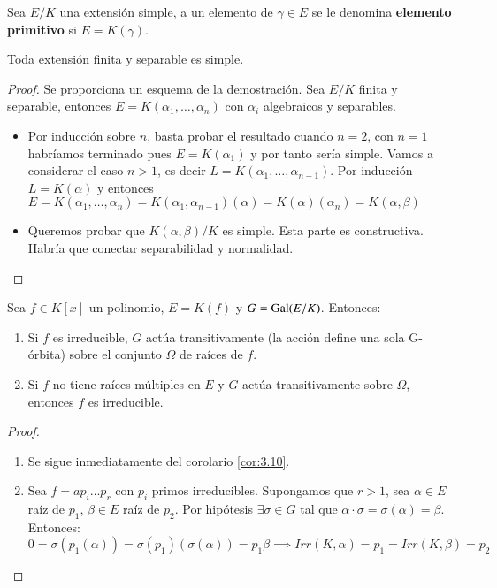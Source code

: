 \begin{dfn}
    Sea $E/K$ una extensión simple, a un elemento de $\gamma \in E$ se le denomina \textbf{elemento primitivo} si $E = K(\gamma)$.
\end{dfn}

\begin{thm}\label{thm:elemprim}
    Toda extensión finita y separable es simple.
\end{thm}

\begin{proof}
    Se proporciona un esquema de la demostración. Sea $E/K$ finita y separable, entonces $E = K(\alpha_1, \ldots, \alpha_n)$ con $\alpha_i$ algebraicos y separables.
    \begin{itemize}
        \item Por inducción sobre $n$, basta probar el resultado cuando $n =2$, con $n = 1$ habríamos terminado pues $E = K(\alpha_1)$ y por tanto sería simple. Vamos a considerar el caso $n > 1$, es decir $L = K(\alpha_1, \ldots, \alpha_{n-1})$. Por inducción $L = K(\alpha)$ y entonces $E = K(\alpha_1, \ldots, \alpha_n) = K(\alpha_1, \alpha_{n-1})(\alpha) = K(\alpha)(\alpha_n) = K(\alpha, \beta)$
        \item Queremos probar que $K(\alpha, \beta)/K$ es simple. Esta parte es constructiva. Habría que conectar separabilidad y normalidad.
    \end{itemize}
\end{proof}


\begin{pro} %
    Sea $f \in K[x]$ un polinomio, $E = K(f)$ y $G = \mathrm{Gal}(E/K)$. Entonces:
    \begin{enumerate}
        \item Si $f$ es irreducible, $G$ actúa transitivamente (la acción define una sola G-órbita) sobre el conjunto $\Omega$ de raíces de $f$.
        \item Si $f$ no tiene raíces múltiples en $E$ y $G$ actúa transitivamente sobre $\Omega$, entonces $f$ es irreducible.
    \end{enumerate}
\end{pro}
\begin{proof}$ $
    \begin{enumerate}
        \item Se sigue inmediatamente del corolario \ref{cor:3.10}.
        \item Sea $f = a p_i \ldots p_r$ con $p_i$ primos irreducibles. Supongamos que $r > 1$, sea $\alpha \in E$ raíz de $p_1$, $\beta \in E$ raíz de $p_2$. Por hipótesis $\exists \sigma \in G$ tal que $\alpha \cdot \sigma = \sigma(\alpha) = \beta$. Entonces:
        $$
            0 = \sigma(p_1(\alpha)) = \sigma(p_1)(\sigma(\alpha)) = p_1 \beta \implies Irr(K, \alpha) = p_1 = Irr(K, \beta) = p_2
        $$
    \end{enumerate}
\end{proof}

